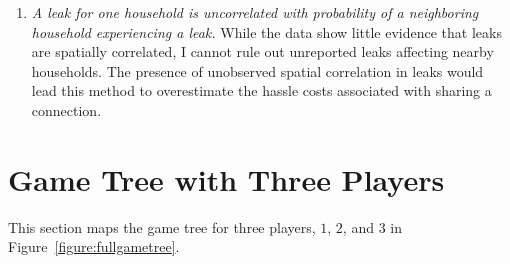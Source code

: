 \documentclass[12pt]{article}
\begin{document}
\begin{appendices}
\begin{enumerate}
	\item \textit{  A leak for one household is uncorrelated with probability of a neighboring household experiencing a leak. }  While the data show little evidence that leaks  are spatially correlated, I cannot rule out unreported leaks affecting nearby households.  The presence of unobserved spatial correlation in leaks would lead this method to overestimate the hassle costs associated with sharing a connection.
\end{enumerate}







\section{Game Tree with Three Players}\label{appendix:gametreefull}

This section maps the game tree for three players, $1$, $2$, and $3$ in Figure~\ref{figure:fullgametree}. 



\end{appendices}
\end{document}

